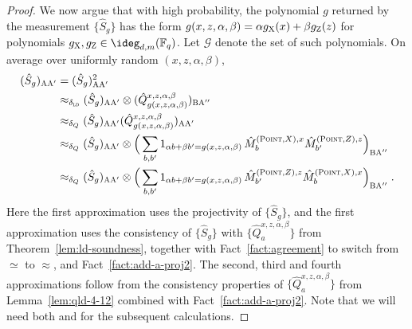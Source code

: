 \documentclass[11pt]{article}
\theoremstyle{definition}
\newcommand{\F}{\ensuremath{\mathbb{F}}}
\newcommand{\ld}{\textsc{ld}}
\newcommand{\labelstyle}[1]{\ensuremath{\textsc{#1}}\xspace}
\newcommand{\xpt}{\labelstyle{X}}
\newcommand{\zpt}{\labelstyle{Z}}
\newcommand{\alice}{\labelstyle{A}}
\newcommand{\bob}{\labelstyle{B}}
\newcommand{\typestyle}[1]{\ensuremath{\textsc{#1}}\xspace}
\newcommand{\Point}{\typestyle{Point}}
\begin{document}
\begin{proof}
	We now argue that with high probability, the polynomial $g$ returned by the measurement $\{\hat{S}_g \}$ has the form $g(x,z,\alpha,\beta) = \alpha g_\xpt(x) + \beta g_\zpt (z)$ for polynomials $g_\xpt, g_\zpt \in \ideg_{d,m}(\F_q)$. Let $\mathcal{G}$ denote the set of such polynomials. On average over uniformly random $(x,z,\alpha,\beta)$, 
	\begin{align}
          (\hat{S}_g)_{\alice \alice'} &= (\hat{S}_g)^2_{\alice \alice'} \notag \\
                                       &\approx_{\delta_\ld} (\hat{S}_g)_{\alice \alice'} \otimes (\hat{Q}^{x,z,\alpha,\beta}_{g(x,z,\alpha,\beta)})_{\bob \alice''}\notag\\
		&\approx_{\delta_Q} (\hat{S}_g)_{\alice \alice'} (\hat{Q}^{x,z,\alpha,\beta}_{g(x,z,\alpha,\beta)})_{\alice \alice'}\notag \\
		&\approx_{\delta_Q} (\hat{S}_g)_{\alice \alice'} \otimes \Big ( \sum_{b,b'} 1_{\alpha b + \beta b' = g(x,z,\alpha,\beta)} \, \hat{M}^{(\Point,X),x}_{b} \hat{M}^{(\Point,Z),z}_{b'} \Big)_{\bob \alice''} \label{eq:qld-g-42} \\
		&\approx_{\delta_Q} (\hat{S}_g)_{\alice \alice'} \otimes \Big ( \sum_{b,b'} 1_{\alpha b + \beta b' = g(x,z,\alpha,\beta)} \, \hat{M}^{(\Point,Z),z}_{b'} \hat{M}^{(\Point,X),x}_{b} \Big)_{\bob \alice''} \;.\label{eq:qld-g-43} 		
	\end{align}
	 Here the first approximation uses the projectivity of $\{\hat{S}_g\}$, and the first approximation uses the consistency of $\{\hat{S}_g\}$ with  $\{\hat{Q}^{x,z,\alpha,\beta}_a\}$ from Theorem~\ref{lem:ld-soundness}, together with Fact~\ref{fact:agreement} to switch from $\simeq$ to $\approx$, and Fact~\ref{fact:add-a-proj2}. The second, third and fourth approximations follow from the consistency properties of $\{\hat{Q}^{x,z,\alpha,\beta}_a\}$ from Lemma~\ref{lem:qld-4-12} combined with Fact~\ref{fact:add-a-proj2}. Note that we will need both  and  for the subsequent calculations.
	

\end{proof}
\end{document}
